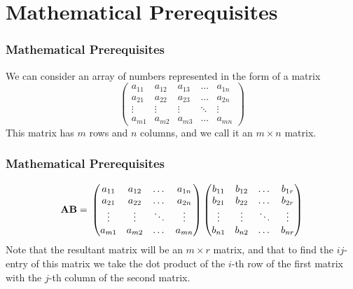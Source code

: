 \documentclass{beamer}
\begin{document}
\section{Mathematical Prerequisites}
\begin{frame}
\frametitle{Mathematical Prerequisites}
\begin{tcolorbox}
[colback=blue!5!white,colframe=blue!75!black,title= Matrices]
We can consider an array of numbers represented in the form of a matrix $$\begin{pmatrix}
    a_{11}&a_{12}&a_{13}&\dots&a_{1n}\\
    a_{21}&a_{22}&a_{23}&\dots&a_{2n}\\
    \vdots&\vdots&\vdots&\ddots&\vdots\\
    a_{m1}&a_{m2}&a_{m3}&\dots&a_{mn}
\end{pmatrix}$$
This matrix has $m$ rows and $n$ columns, and we call it an $m\times n$ matrix. 
\end{tcolorbox}
\end{frame}
\begin{frame}
\frametitle{Mathematical Prerequisites}
\begin{tcolorbox}
[colback=blue!5!white,colframe=blue!75!black,title= Matrix Multiplication]

$$\textbf{AB}=\\ \begin{pmatrix}
    a_{11}&a_{12}&\dots&a_{1n}\\
    a_{21}&a_{22}&\dots&a_{2n}\\

    \vdots&\vdots&\ddots&\vdots\\

    a_{m1}&a_{m2}&\dots&a_{mn}
\end{pmatrix}\begin{pmatrix}
    b_{11}&b_{12}&\dots&b_{1r}\\
    b_{21}&b_{22}&\dots&b_{2r}\\
    
    \vdots&\vdots&\ddots&\vdots\\

    b_{n1}&b_{n2}&\dots&b_{nr}
\end{pmatrix}$$
Note that the resultant matrix will be an $m\times r$ matrix, and that to find the $ij$-entry of this matrix we take the dot product of the $i$-th row of the first matrix with the $j$-th column of the second matrix.
\end{tcolorbox}
\end{frame}
\end{document}
